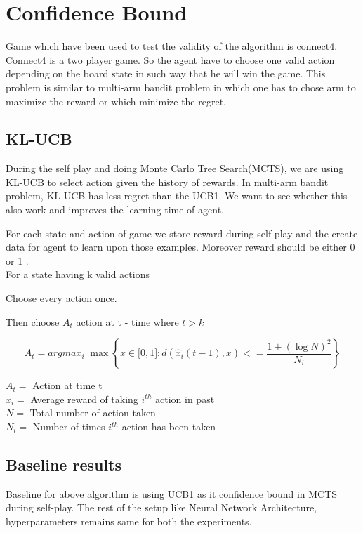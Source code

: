 \chapter{Confidence Bound}
Game which have been used to test the validity of the algorithm is connect4. Connect4 is a two player game. 
So the agent have to choose one valid action depending on the board state in such way that he will win the game. This problem is similar to multi-arm bandit problem in which one has to chose arm to maximize the reward or which minimize the regret.

\section{KL-UCB}
During the self play and doing Monte Carlo Tree Search(MCTS), we are using KL-UCB to select action given the history of rewards. In multi-arm bandit problem, KL-UCB has less regret than the UCB1. We want to see whether this also work and improves the learning time of agent.

For each state and action of game we store reward during self play and the create data for agent to learn upon those examples. Moreover reward should be either 0 or 1 .\\
For a state having k valid actions
 \begin{steps}
  
  \item Choose every action once.
  \item Then choose $A_{t}$ action at t - time where $t>k$
	   
$$ A_{t} = argmax_{i}\; \max \left \lbrace x  \in \lbrack 0,1 \rbrack  : d(\hat{x}_{i}(t-1), x) <=  \dfrac{1 + (\log N)^{2}}{N_{i}} \right \rbrace  $$

$A_{t} = $ Action at time t \\
$\hat{x}_{i}  = $ Average reward of taking $i^{th}$  action in past \\
$N = $ Total number of action taken\\
$N_{i} = $ Number of times $i^{th}$ action has been taken\\



\end{steps}

\section{Baseline results}
Baseline for above algorithm is using UCB1 as it confidence bound in MCTS during self-play. The rest of the setup like Neural Network Architecture, hyperparameters remains same for both the experiments.

